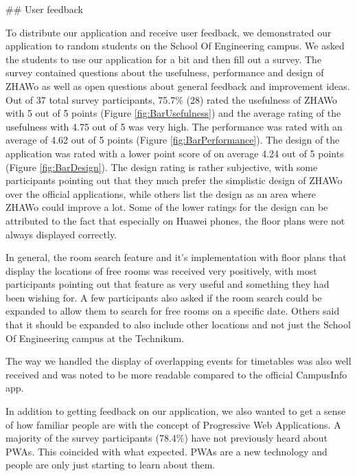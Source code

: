 \begin{markdown}
## User feedback

To distribute our application and receive user feedback, we demonstrated our application to random students on the School Of Engineering campus. We asked the students to use our application for a bit and then fill out a survey. The survey contained questions about the usefulness, performance and design of ZHAWo as well as open questions about general feedback and improvement ideas. Out of 37 total survey participants, 75.7\% (28) rated the usefulness of ZHAWo with 5 out of 5 points (Figure \ref{fig:BarUsefulness}) and the average rating of the usefulness with 4.75 out of 5 was very high. The performance was rated with an average of 4.62 out of 5 points (Figure \ref{fig:BarPerformance}). The design of the application was rated with a lower point score of on average 4.24 out of 5 points (Figure \ref{fig:BarDesign}). The design rating is rather subjective, with some participants pointing out that they much prefer the simplistic design of ZHAWo over the official applications, while others list the design as an area where ZHAWo could improve a lot. Some of the lower ratings for the design can be attributed to the fact that especially on Huawei phones, the floor plans were not always displayed correctly.

In general, the room search feature and it's implementation with floor plans that display the locations of free rooms was received very positively, with most participants pointing out that feature as very useful and something they had been wishing for. A few participants also asked if the room search could be expanded to allow them to search for free rooms on a specific date. Others said that it should be expanded to also include other locations and not just the School Of Engineering campus at the Technikum.

The way we handled the display of overlapping events for timetables was also well received and was noted to be more readable compared to the official CampusInfo app.

In addition to getting feedback on our application, we also wanted to get a sense of how familiar people are with the concept of Progressive Web Applications. A majority of the survey participants (78.4\%) have not previously heard about PWAs. This coincided with what expected. PWAs are a new technology and people are only just starting to learn about them. 


\end{markdown}
